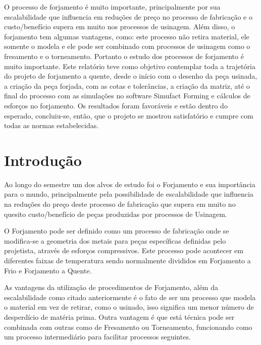 \documentclass[deposito, acronym, symbols]{fei}
\begin{document}


\tableofcontents
\listoffigures
\listoftables

\begin{resumo}

O processo de forjamento é muito importante, principalmente por sua escalabilidade que influencia em reduções de preço no processo de fabricação e o custo/benefício supera em muito nos processos de usinagem. Além disso, o forjamento tem algumas vantagens, como: este processo não retira material, ele somente o modela e ele pode ser combinado com processos de usinagem como o fresamento e o torneamento. Portanto o estudo dos processos de forjamento é muito importante. Este relatório teve como objetivo contemplar toda a trajetória do projeto de forjamento a quente, desde o início com o desenho da peça usinada, a criação da peça forjada, com as cotas e tolerâncias, a criação da matriz, até o final do processo com as simulações no software Simufact Forming e cálculos de esforços no forjamento. Os resultados foram favoráveis e estão dentro do esperado, concluiu-se, então, que o projeto se mostrou satisfatório e cumpre com todas as normas estabelecidas.


\end{resumo}

\chapter{Introdução}

Ao longo do semestre um dos alvos de estudo foi o Forjamento e sua importância para o mundo, principalmente pela possibilidade de escalabilidade que influencia na reduções do preço deste processo de fabricação que supera em muito no quesito custo/benefício de peças produzidas por processos de Usinagem.

O Forjamento pode ser definido como um processo de fabricação onde se modifica-se a geometria dos metais para peças específicas definidas pelo projetista, através de esforços compressivos. Este processo pode acontecer em diferentes faixas de temperatura sendo normalmente divididos em Forjamento a Frio e Forjamento a Quente.

As vantagens da utilização de procedimentos de Forjamento, além da escalabilidade como citado anteriormente é o fato de ser um processo que modela o material em vez de retirar, como o usinado, isso significa um menor número de desperdício de matéria prima. Outra vantagem é que está técnica pode ser combinada com outras como de Fresamento ou Torneamento, funcionando como um processo intermediário para facilitar processos seguintes.
\end{document}
